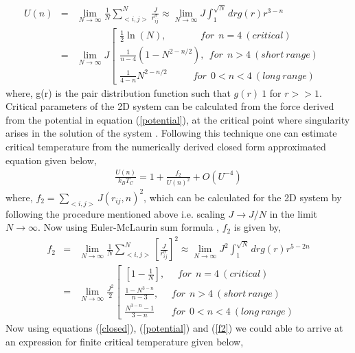 \documentclass[preprintnumbers,amsmath,amssymb,onecolumn]{revtex4}
\begin{document}
\begin{eqnarray}
\label{potential}
U\left(n\right)&=&\underset{N\rightarrow\infty}{\lim}\frac{1}{N}\sum_{<i,j>}^{N}\frac{J}{r_{ij}^{\sigma}}\approx \lim_{N\rightarrow\infty}J\int_{1}^{\sqrt{N}}drg(r)r^{3-n}\nonumber\\
&=&\lim_{N\rightarrow\infty}J\left[
\begin{matrix}
\frac{1}{2}\ln(N),~~~~~~~~~~~~~~~~for~~n=4~(critical)~~~~~~~~~~\\
\frac{1}{n-4}\left(1-N^{2-n/2}\right),~~for~~n>4~(short~range)~~~~~\\
\frac{1}{4-n}N^{2-n/2}~~~~~~~~~~~~for~~0<n<4~(long~range)~
\end{matrix}
\right.
\end{eqnarray}
where, g(r) is the pair distribution function such that $g(r) ~ 1$ for $r >> 1$. Critical parameters of the 2D system can be calculated from the force derived from the potential in equation (\ref{potential}), at the critical point where singularity arises in the solution of the system \citep{Hiley1965}. Following this technique one can estimate critical temperature from the numerically derived closed form approximated equation \citep{Hiley1965} given below,
\begin{eqnarray}
\label{closed}
\frac{U(n)}{k_BT_C}=1+\frac{f_2}{U(n)^2}+O(U^{-4})
\end{eqnarray}
where, $f_2=\sum_{<i,j>}J(r_{ij},n)^2$, which can be calculated for the 2D system by following the procedure mentioned above i.e. scaling $J\rightarrow J/N$  in the limit $N\rightarrow\infty$. Now using Euler-McLaurin sum formula \citep{bruijn1981}, $f_2$ is given by,
\begin{eqnarray}
\label{f2}
f_2&=&\underset{N\rightarrow\infty}{\lim}\frac{1}{N}\sum_{<i,j>}^{N}\left[\frac{J}{r_{ij}^{\sigma}}\right]^2\approx \lim_{N\rightarrow\infty}J^2\int_{1}^{\sqrt{N}}drg(r)r^{5-2n}\nonumber\\
&=&\lim_{N\rightarrow\infty}\frac{J^2}{2}\left[
\begin{matrix}
\left[1-\frac{1}{N}\right],~~~~~~for~~n=4~(critical)~~~~~~~~~~\\
\frac{1-N^{3-n}}{n-3},~~~~~~for~~n>4~(short~range)~~~~~\\
\frac{N^{3-n}-1}{3-n}~~~~~~~~for~~0<n<4~(long~range)~~
\end{matrix}
\right.
\end{eqnarray}
Now using equations (\ref{closed}), (\ref{potential}) and (\ref{f2}) we could able to arrive at an expression for finite critical temperature given below,
\end{document}
